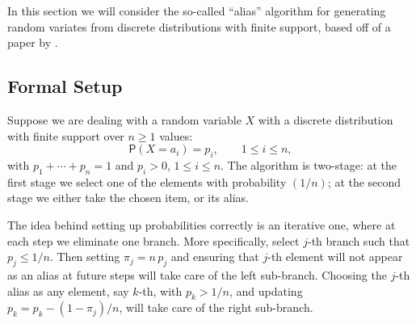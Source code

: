 \documentclass{article}
\renewcommand{\geq}{\geqslant}
\renewcommand{\leq}{\leqslant}
\renewcommand{\Pr}{\mathsf{P}}
\theoremstyle{definition} %
\begin{document}
In this section we will consider the so-called ``alias'' algorithm for generating random variates from discrete distributions with finite support, based off of a paper by \citet{Vose:91}.

\subsection{Formal Setup}

Suppose we are dealing with a random variable $X$ with a discrete distribution with finite support over $n \geq 1$ values:
\[
    \Pr (X = a_i) = p_i, \qquad 1 \leq i \leq n,
\]
with $p_1 + \cdots + p_n = 1$ and $p_i > 0$, $1 \leq i \leq n$. The algorithm is two-stage: at the first stage we select one of the elements with probability $(1/n)$; at the second stage we either take the chosen item, or its alias.
\begin{center}
\end{center}
The idea behind setting up probabilities correctly is an iterative one, where at each step we eliminate one branch. More specifically, select $j$-th branch such that $p _j \leq 1/n$. Then setting $\pi _j = n \, p_j$ and ensuring that $j$-th element will not appear as an alias at future steps will take care of the left sub-branch. Choosing the $j$-th alias as any element, say $k$-th, with $p _k > 1/n$, and updating $p_k = p_k - (1 - \pi _j) / n$, will take care of the right sub-branch.
\end{document}

